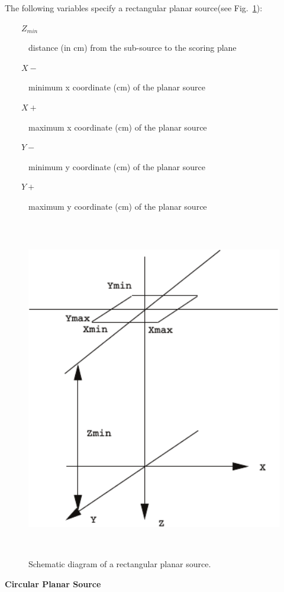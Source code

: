 \documentclass[12pt,twoside]{article}
\begin{document}
The following variables specify a rectangular planar source(see Fig.~\ref{source4}):
\begin{description}
\item [~~~~$Z_{min}$] distance (in cm) from the sub-source to the scoring plane
\item [~~~~$X-$] minimum x coordinate (cm) of the planar source
\item [~~~~$X+$] maximum x coordinate (cm) of the planar source
\item [~~~~$Y-$] minimum y coordinate (cm) of the planar source
\item [~~~~$Y+$] maximum y coordinate (cm) of the planar source

\end{description}
\begin{figure}[htbp]
\begin{center}
\leavevmode
\mbox{}\hspace{0cm}
\includegraphics[height=15cm]{figures/source4}
\caption[]
{Schematic diagram of a rectangular planar source. }
\label{source4}
\end{center}
\end{figure}

{\bf Circular Planar Source}
\end{document}
